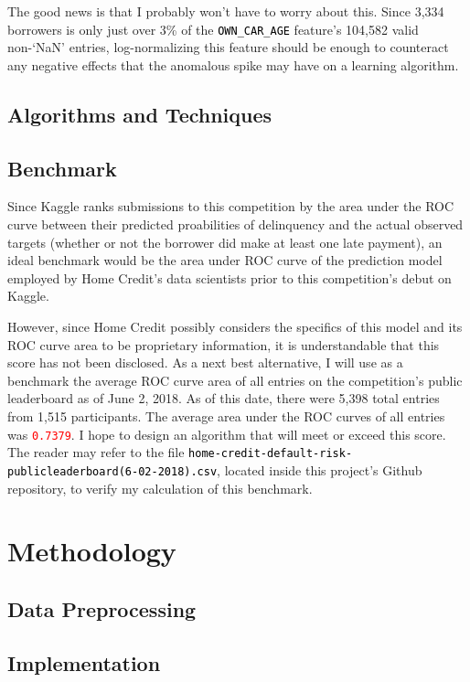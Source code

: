 \documentclass[12pt, letterpaper]{article}
\begin{document}
The good news is that I probably won't have to worry about this. Since 3,334 borrowers is only just over 3\% of the \colorbox{backcolor}{\textcolor{black}{\texttt{OWN_CAR_AGE}}} feature's 104,582 valid non-`NaN' entries, log-normalizing this feature should be enough to counteract any negative effects that the anomalous spike may have on a learning algorithm.

\subsection{Algorithms and Techniques}


\subsection{Benchmark}
Since Kaggle ranks submissions to this competition by the area under the ROC curve between their predicted proabilities of delinquency and the actual observed targets (whether or not the borrower did make at least one late payment), an ideal benchmark would be the area under ROC curve of the prediction model employed by Home Credit's data scientists prior to this competition's debut on Kaggle.

However, since Home Credit possibly considers the specifics of this model and its ROC curve area to be proprietary information, it is understandable that this score has not been disclosed. As a next best alternative, I will use as a benchmark the average ROC curve area of all entries on the competition's public leaderboard\cite{kagglehomecreditcompetitionpublicleaderboard} as of June 2, 2018. As of this date, there were 5,398 total entries from 1,515 participants. The average area under the ROC curves of all entries was \colorbox{backcolor}{\textcolor{red}{\texttt{0.7379}}}. I hope to design an algorithm that will meet or exceed this score. The reader may refer to the file \colorbox{backcolor}{\textcolor{black}{\texttt{home-credit-default-risk-publicleaderboard(6-02-2018).csv}}}, located inside this project's Github repository\cite{githubprojectrepo}, to verify my calculation of this benchmark.

\section{Methodology}
\subsection{Data Preprocessing}
\subsection{Implementation}
\end{document}
